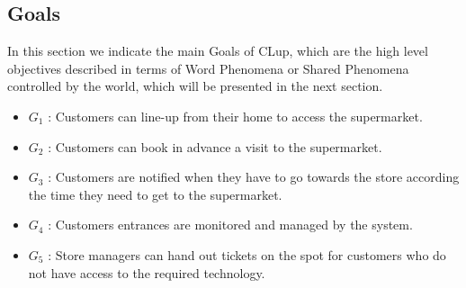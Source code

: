 \subsection{Goals}
In this section we indicate the main Goals of CLup, which are the high level objectives described in terms of Word Phenomena or Shared Phenomena controlled by the world, which will be presented in the next section.
\begin{itemize}
	\item $G_1$ : Customers can line-up from their home to access the supermarket.
	\item $G_2$ : Customers can book in advance a visit to the supermarket.
	\item $G_3$ : Customers are notified when they have to go towards the store according the time they need to get to the supermarket. 
	\item $G_4$ : Customers entrances are monitored and managed by the system.
	\item $G_5$ : Store managers can hand out tickets on the spot for customers who do not have access to the required technology.
\end{itemize}

 
 